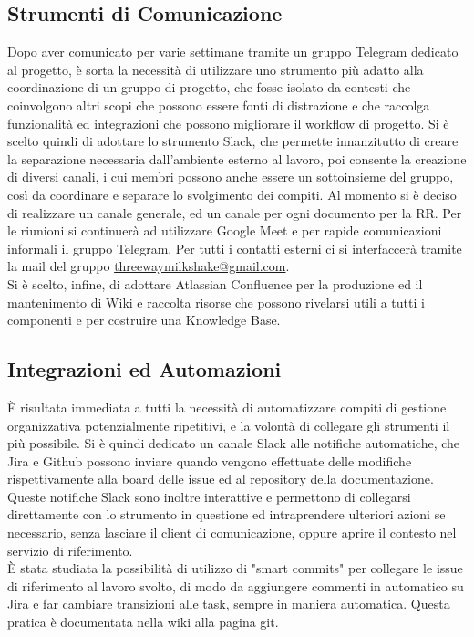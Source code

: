\subsection{Strumenti di Comunicazione}
Dopo aver comunicato per varie settimane tramite un gruppo Telegram dedicato al progetto, è sorta la necessità di utilizzare uno strumento più adatto alla coordinazione di un gruppo di progetto, che fosse isolato da contesti che coinvolgono altri scopi che possono essere fonti di distrazione e che raccolga funzionalità ed integrazioni che possono migliorare il workflow di progetto. Si è scelto quindi di adottare lo strumento Slack, che permette innanzitutto di creare la separazione necessaria dall'ambiente esterno al lavoro, poi consente la creazione di diversi canali, i cui membri possono anche essere un sottoinsieme del gruppo, così da coordinare e separare lo svolgimento dei compiti. Al momento si è deciso di realizzare un canale generale, ed un canale per ogni documento per la RR. Per le riunioni si continuerà ad utilizzare Google Meet e per rapide comunicazioni informali il gruppo Telegram. Per tutti i contatti esterni ci si interfaccerà tramite la mail del gruppo \href{mailto:threewaymilkshake@gmail.com}{threewaymilkshake@gmail.com}.\\
Si è scelto, infine, di adottare Atlassian Confluence per la produzione ed il mantenimento di Wiki e raccolta risorse che possono rivelarsi utili a tutti i componenti e per costruire una Knowledge Base.

\subsection{Integrazioni ed Automazioni}
È risultata immediata a tutti la necessità di automatizzare compiti di gestione organizzativa potenzialmente ripetitivi, e la volontà di collegare gli strumenti il più possibile. Si è quindi dedicato un canale Slack alle notifiche automatiche, che Jira e Github possono inviare quando vengono effettuate delle modifiche rispettivamente alla board delle issue ed al repository della documentazione. Queste notifiche Slack sono inoltre interattive e permettono di collegarsi direttamente con lo strumento in questione ed intraprendere ulteriori azioni se necessario, senza lasciare il client di comunicazione, oppure aprire il contesto nel servizio di riferimento.\\
È stata studiata la possibilità di utilizzo di "smart commits" per collegare le issue di riferimento al lavoro svolto, di modo da aggiungere commenti in automatico su Jira e far cambiare transizioni alle task, sempre in maniera automatica. Questa pratica è documentata nella wiki alla pagina git.